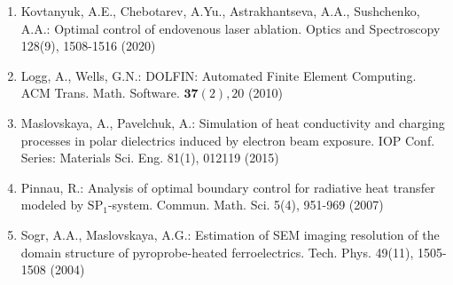 \documentclass[10pt]{article}
\begin{document}
\begin{enumerate}
  \item Kovtanyuk, A.E., Chebotarev, A.Yu., Astrakhantseva, A.A., Sushchenko, A.A.: Optimal control of endovenous laser ablation. Optics and Spectroscopy 128(9), 1508-1516 (2020)

  \item Logg, A., Wells, G.N.: DOLFIN: Automated Finite Element Computing. ACM Trans. Math. Software. $\mathbf{3 7}(2), 20$ (2010)

  \item Maslovskaya, A., Pavelchuk, A.: Simulation of heat conductivity and charging processes in polar dielectrics induced by electron beam exposure. IOP Conf. Series: Materials Sci. Eng. 81(1), 012119 (2015)

  \item Pinnau, R.: Analysis of optimal boundary control for radiative heat transfer modeled by $\mathrm{SP}_{1}$-system. Commun. Math. Sci. 5(4), 951-969 (2007)

  \item Sogr, A.A., Maslovskaya, A.G.: Estimation of SEM imaging resolution of the domain structure of pyroprobe-heated ferroelectrics. Tech. Phys. 49(11), 1505-1508 (2004)

\end{enumerate}
\end{document}
